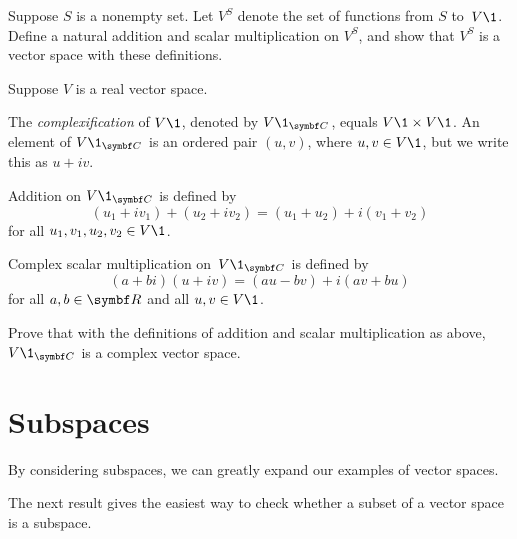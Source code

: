 \begin{exercises}
\exercise
Suppose $S$ is a nonempty set. Let $V^S$ denote the set of functions from $S$ to~$V\1$. Define a natural addition and scalar multiplication on $V^S\!$, and show that $V^S$ is a vector space with these definitions.


\exercise
Suppose $V$ is a real vector space.
\vspace{-.075in}
\begin{Itemize}
\item
The \emph{complexification} of $V\1$, denoted by $V\1_{\C{}}$, equals $V\1 \times V\1$. An element of $V\1_{\C{}}$ is an ordered pair $(u, v)$, where $u, v \in V\1$, but we write this as $u + iv$.
\item
Addition on $V\1_{\C{}}$ is defined by\label{1VC}
\[
(u_1 + i v_1) + (u_2 + i v_2) = (u_1 + u_2) + i (v_1 + v_2)
\]
for all $u_1, v_1, u_2, v_2 \in V\1$.
\item
Complex scalar multiplication on~$V\1_{\C{}}$ is defined by
\[
(a + bi)(u + iv) = (au - bv) + i(av + bu)
\]
for all $a, b \in \R{}$ and all $u, v \in V\1$.
\end{Itemize}
Prove that with the definitions of addition and
scalar multiplication as above, $V\1_{\C{}}$ is a complex vector space.


\end{exercises}

\section{Subspaces} \label{1Subspaces}

By considering subspaces, we can greatly expand our examples of vector spaces.



The next result gives the easiest way to check whether a subset of a vector space is a subspace.


